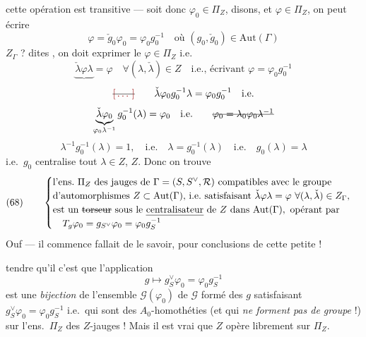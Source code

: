 \documentclass[11pt,a4paper]{article}
\begin{document}
cette opération est transitive — soit donc $\varphi_0 \in \Pi_Z$, disons, et
$\varphi \in \Pi_Z$, on peut écrire
\[
\varphi = \check{g}_0 \varphi_0 = \varphi_0 g_0^{-1} \quad \text{où } (g_0, \check{g}_0) \in \mathrm{Aut}(\Gamma)
\]
 $Z_{\Gamma}$ ?  dites 
, on doit exprimer le $\varphi \in \Pi_Z$ i.e.
\[
\underbrace{\check{\lambda} \varphi \lambda}_{} = \varphi \quad \forall (\lambda, \check{\lambda}) \in Z \quad \text{i.e., écrivant } \varphi = \varphi_0 g_0^{-1}
\]
\[
\text{\struck{\ill{}}}\qquad
\check{\lambda} \varphi_0 g_0^{-1} \lambda = \varphi_0 g_0^{-1} \quad \text{i.e.}
\]
\[
\underbrace{\check{\lambda} \varphi_0}_{\varphi_0 \lambda^{-1}} g_0^{-1}(\lambda) = \varphi_0 \quad \text{i.e.}
\qquad \text{\struck{$\varphi_0 = \lambda_0 \varphi_0 \lambda^{-1}$}}
\]
\[
\lambda^{-1} g_0^{-1}(\lambda) = 1, \quad \text{i.e.} \quad \lambda = g_0^{-1}(\lambda) \quad \text{i.e.} \quad g_0(\lambda) = \lambda
\]
i.e.\ $g_0$  centralise tout $\lambda \in Z$, 
\struck{\ill{}} $Z$. Donc on trouve
\[
(68)\qquad
\begin{cases}
\text{l'ens.\ } \Pi_Z \text{ des jauges de } \Gamma = (S, S^{\vee}, \mathcal{R}) \text{ compatibles avec le groupe} \\
\text{d'automorphismes } Z \subset \mathrm{Aut}(\Gamma) \text{, i.e.\ satisfaisant } \check{\lambda}\varphi\lambda = \varphi\ \forall (\lambda, \check{\lambda}) \in Z_{\Gamma}, \\
\text{est un \struck{torseur} sous le \emph{centralisateur} de } Z \text{ dans } \mathrm{Aut}(\Gamma), \text{ opérant par} \\
\quad T_g \varphi_0 = g_{S^{\vee}} \varphi_0 = \varphi_0 g_S^{-1}
\end{cases}
\]
Ouf — il commence  fallait de le savoir, pour 
conclusions de cette petite  ! 

\ill{} tendre qu'il  c'est que l'application
\[
g \longmapsto g_{S}^{\vee} \varphi_0 = \varphi_0 g_S^{-1}
\]
est une \emph{bijection} de l'ensemble $\mathcal{G}(\varphi_0)$ de $\mathcal{G}$
formé des $g$ satisfaisant $g_{S}^{\vee} \varphi_0 = \varphi_0 g_S^{-1}$ i.e.\ qui
sont des $A_{0}$-homothéties (et qui \emph{ne forment pas de groupe} !) sur l'ens.\
$\Pi_Z$ des $Z$-jauges ! Mais il est vrai que $Z$ opère librement sur $\Pi_Z$.
\end{document}
